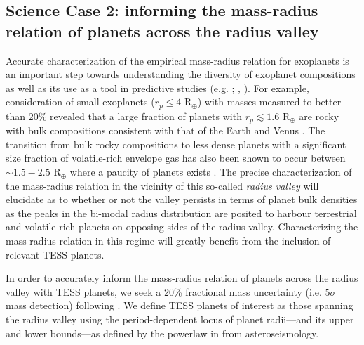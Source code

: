 \subsection{Science Case 2: informing the mass-radius relation of planets across the radius valley} \label{RVFCsect:mr}
Accurate characterization of the empirical mass-radius relation for exoplanets
\citep[e.g.][]{weiss13, rogers15, wolfgang16} is an important step towards
understanding the diversity of exoplanet compositions as well as its use as a tool in
predictive studies (e.g. ; \citealt{cloutier17a}, \citealt{cloutier18}).
For example, consideration of small
exoplanets ($r_p \leq 4$ R$_{\oplus}$) with masses measured to better than 20\% revealed that a
large fraction of planets with $r_p \lesssim 1.6$ R$_{\oplus}$ are rocky with bulk compositions
consistent with that of the Earth and Venus \citep{dressing15b}.
The transition from bulk rocky compositions to less dense planets with a significant size fraction of
volatile-rich envelope gas has also been shown to occur
between $\sim 1.5-2.5$ R$_{\oplus}$ where a paucity of planets exists \citep{fulton17, vaneylen18}.
The precise characterization of the mass-radius relation in the vicinity of this so-called
\emph{radius valley} will elucidate as to whether or not the valley persists in terms of planet bulk
densities as the peaks in the bi-modal radius distribution are posited to harbour terrestrial and
volatile-rich planets on opposing sides of the radius valley. Characterizing the mass-radius relation
in this regime will greatly benefit from the inclusion of relevant TESS planets.

In order to accurately inform the mass-radius relation of planets across the radius valley 
with TESS planets, we seek a 20\% fractional mass uncertainty (i.e. $5\sigma$ mass detection) following
\cite{dressing15b}. We define TESS planets
of interest as those spanning the radius valley using the period-dependent locus of planet radii---and
its upper and lower bounds---as defined by the powerlaw in \cite{vaneylen18} from asteroseismology.

